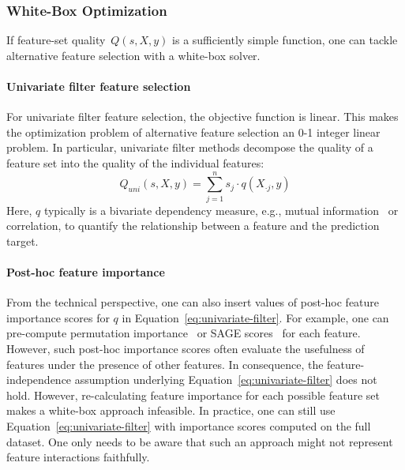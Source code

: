 \documentclass[conference]{IEEEtran}
\theoremstyle{definition}
\begin{document}
\subsubsection{White-Box Optimization}
\label{sec:approach:objectives:white-box}

If feature-set quality~$Q(s,X,y)$ is a sufficiently simple function, one can tackle alternative feature selection with a white-box solver.

\paragraph{Univariate filter feature selection}

For univariate filter feature selection, the objective function is linear.
This makes the optimization problem of alternative feature selection an 0-1 integer linear problem.
In particular, univariate filter methods decompose the quality of a feature set into the quality of the individual features:
%
\begin{equation}
	Q_{uni}(s,X,y) = \sum_{j=1}^{n} s_j  \cdot q(X_{\cdot{}j},y)
	\label{eq:univariate-filter}
\end{equation}
%
Here, $q$ typically is a bivariate dependency measure, e.g., mutual information~\cite{kraskov2004estimating} or correlation, to quantify the relationship between a feature and the prediction target.

\paragraph{Post-hoc feature importance}

From the technical perspective, one can also insert values of post-hoc feature importance scores for $q$ in Equation~\ref{eq:univariate-filter}.
For example, one can pre-compute permutation importance~\cite{breiman2001random} or SAGE scores~\cite{covert2020understanding} for each feature.
However, such post-hoc importance scores often evaluate the usefulness of features under the presence of other features.
In consequence, the feature-independence assumption underlying Equation~\ref{eq:univariate-filter} does not hold.
However, re-calculating feature importance for each possible feature set makes a white-box approach infeasible.
In practice, one can still use Equation~\ref{eq:univariate-filter} with importance scores computed on the full dataset.
One only needs to be aware that such an approach might not represent feature interactions faithfully.
\end{document}
